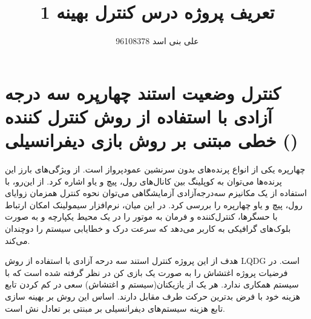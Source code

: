 \documentclass[12 pt]{article}
\title{تعریف پروژه درس کنترل بهینه 1}
\author{علی بنی اسد 96108378}
\begin{document}
	\maketitle
	\section*{کنترل وضعیت استند چهارپره
		 سه درجه آزادی 
		با استفاده از روش کنترل کننده خطی مبتنی بر روش بازی دیفرانسیلی
()	
}





چهارپره یکی از انواع پرنده‌های بدون سرنشین عمودپرواز است. از ویژگی‌های بارز این پرنده‌ها می‌توان به کوپلینگ بین کانال‌های رول، پیچ و یاو اشاره کرد. از این‌رو، با استفاده از یک مکانیزم ‌سه‌درجه‌آزادی آزمایشگاهی می‌توان نحوه کنترل همزمان زوایای رول، پیچ و یاو چهارپره را بررسی کرد. در این میان، نرم‌افزار‌ سیمولینک امکان ارتباط با حسگرها، کنترل‌کننده و فرمان به موتور را در یک محیط یکپارچه و به ‌صورت بلوک‌های گرافیکی به کاربر می‌دهد که سرعت درک و خطا‌یابی سیستم را دوچندان می‌کند.



هدف از این پروژه کنترل استند سه درحه آزادی با استفاده از روش LQDG است. در فرضیات پروژه اغتشاش را به صورت یک بازی کن در نظر گرفته شده است که با سیستم همکاری ندارد. هر یک از یازیکنان(سیستم و اغتشاش) سعی در کم کردن تابع هزینه خود با فرض بدترین حرکت طرف مقابل دارند. اساس این روش بر بهینه سازی تابع هزینه سیستم‌های دیفرانسیلی بر مبنتی بر تعادل نش 
است.
\end{document}
